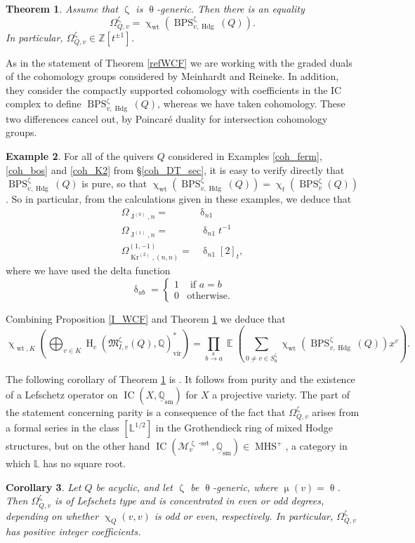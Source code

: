 \documentclass{amsart}
\DeclareMathOperator{\moLQ}{J}
\DeclareMathOperator{\moKr}{Kr}
\newcommand{\Kr}[1]{\moKr^{(#1)}}
\newcommand{\LQ}[1]{\moLQ^{(#1)}}
\DeclareMathOperator{\IC}{IC}
\newcommand{\Msp}{\mathcal{M}}
\newcommand{\Mst}{\mathfrak{M}}
\newcommand{\LL}{\mathbb{L}}
\DeclareMathOperator{\MHS}{MHS}
\DeclareMathOperator{\Wt}{wt}
\DeclareMathOperator{\HO}{H}
\DeclareMathOperator{\sstable}{-sst}
\DeclareMathOperator{\BPS}{BPS}
\DeclareMathOperator{\vir}{vir}
\DeclareMathOperator{\EE}{\mathbb{E}}
\DeclareMathOperator{\Hodge}{Hdg}
\renewcommand{\theta}{\uptheta}
\renewcommand{\delta}{\updelta}
\renewcommand{\zeta}{\upzeta}
\renewcommand{\chi}{\upchi}
\renewcommand{\mu}{\upmu}
\theoremstyle{plain}%
\newtheorem{thm}{Theorem}[section]
\newtheorem{cor}[thm]{Corollary}
\theoremstyle{definition}
\newtheorem{eg}[thm]{Example}
\theoremstyle{remark}
\begin{document}
\begin{thm}\cite{MeiRei}\label{MRtheorem}
Assume that $\zeta$ is $\theta$-generic.  Then there is an equality
\[
\Omega^{\zeta}_{Q,v}=\chi_{\Wt}(\BPS_{v,\Hodge}^{\zeta}(Q)).
\]
In particular, $\Omega_{Q,v}^{\zeta}\in\mathbb{Z}[t^{\pm 1}]$.
\end{thm}
As in the statement of Theorem \ref{refWCF} we are working with the graded duals of the cohomology groups considered by Meinhardt and Reineke.  In addition, they consider the compactly supported cohomology with coefficients in the IC complex to define $\BPS_{v,\Hodge}^{\zeta}(Q)$, whereas we have taken cohomology.  These two differences cancel out, by Poincar\'e duality for intersection cohomology groups.
\begin{eg}
\label{ref_examples}
For all of the quivers $Q$ considered in Examples \ref{coh_ferm}, \ref{coh_bos} and \ref{coh_K2} from \S \ref{coh_DT_sec}, it is easy to verify directly that $\BPS_{v,\Hodge}^{\zeta}(Q)$ is pure, so that $\chi_{\Wt}(\BPS_{v,\Hodge}^{\zeta}(Q))=\chi_t(\BPS_{v}^{\zeta}(Q))$.  So in particular, from the calculations given in these examples, we deduce that 
\begin{align}
    \Omega_{\LQ{0},n}=&\delta_{n1}\label{ref_ferm} \\
    \Omega_{\LQ{1},n}=&\delta_{n1}t^{-1}\label{ref_bos} \\ 
    \Omega_{\Kr{2},(n,n)}^{(1,-1)}=&\delta_{n1}[2]_t,\label{ref_Kron}
\end{align}
where we have used the delta function 
\[
\delta_{ab}=\begin{cases} 1& \textrm{ if }a=b\\
0& \textrm{otherwise.}
\end{cases}
\]
\end{eg}
Combining Proposition \ref{I_WCF} and Theorem \ref{MRtheorem} we deduce that
\begin{equation}\label{GrandForm}
\chi_{\Wt,K}\left(\bigoplus_{v\in K}\HO_c\left(\Mst^{\zeta}_{I,v}(Q),\mathbb{Q}\right)_{\vir}^*\right)=\prod_{b\xrightarrow{\theta} a}\EE\left(\sum_{0\neq v\in S^{\zeta}_{\theta}} \chi_{\Wt}\left(\BPS_{v,\Hodge}^{\zeta}(Q)\right)x^v\right).
\end{equation}

The following corollary of Theorem \ref{MRtheorem} is \cite[Cor 1.2]{MeiRei}.  It follows from purity and the existence of a Lefschetz operator on $\IC(X,\underline{\mathbb{Q}}_{\textrm{sm}})$ for $X$ a projective variety.  The part of the statement concerning parity is a consequence of the fact that $\Omega_{Q,v}^{\zeta}$ arises from a formal series  in the class $[\LL^{1/2}]$ in the Grothendieck ring of mixed Hodge structures, but on the other hand $\IC(\Msp_v^{\zeta\sstable},\underline{\mathbb{Q}}_{\textrm{sm}})\in \MHS^+$, a category in which $\LL$ has no square root. 
\begin{cor}\cite{MeiRei}\label{MRcor}
Let $Q$ be acyclic, and let $\zeta$ be $\theta$-generic, where $\mu(v)=\theta$.  Then $\Omega_{Q,v}^{\zeta}$ is of Lefschetz type and is concentrated in even or odd degrees, depending on whether $\chi_Q(v,v)$ is odd or even, respectively.  In particular, $\Omega_{Q,v}^{\zeta}$ has positive integer coefficients.
\end{cor}
\end{document}
